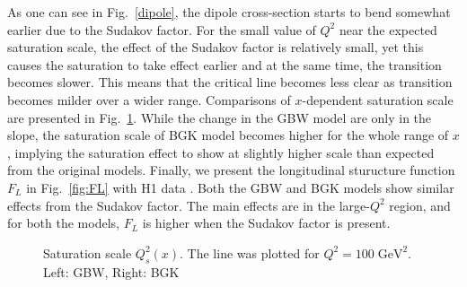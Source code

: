 \documentclass[11pt]{article}
\begin{document}
As one can see in Fig.~\ref{dipole}, the dipole cross-section starts to bend somewhat earlier due to the Sudakov factor. For the small value of $Q^2$ near the expected saturation scale, the effect of the Sudakov factor is relatively small, yet this causes the saturation to take effect earlier and at the same time, the transition becomes slower. This means that the critical line becomes less clear as transition becomes milder over a wider range. %
Comparisons of $x$-dependent saturation scale are presented in Fig.~\ref{fig:critical}. While the change in the GBW model  are only in the slope, the saturation scale of  BGK model becomes higher for the whole range of $x$, implying the saturation effect to show at slightly higher scale than expected from the original models.
{\color{blue}Finally, we present the longitudinal sturucture function $F_L$ in Fig.~\ref{fig:FL} with H1 data \cite{FL}. Both the GBW and BGK models show similar effects from the Sudakov factor. The main effects are in the large-$Q^2$ region, and for both the models, $F_L$ is higher when the Sudakov factor is present. }

\begin{figure}[H]
\caption{Saturation scale $Q_s^2(x)$.
The line was plotted for $Q^2=100\;\mathrm{ GeV^2}$.\\Left: GBW, Right: BGK }
\label{fig:critical}
\end{figure}
\end{document}
